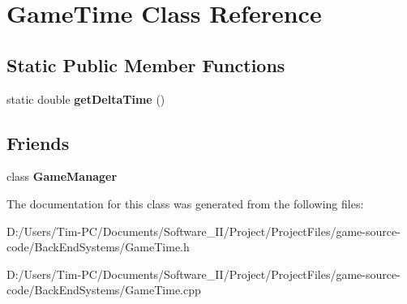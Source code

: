 \hypertarget{class_game_time}{}\section{Game\+Time Class Reference}
\label{class_game_time}
\subsection*{Static Public Member Functions}
\begin{DoxyCompactItemize}
\item 
\mbox{\label{class_game_time_aa5ea84c887116ef68d1331617c5a81c3}} 
static double {\bfseries get\+Delta\+Time} ()
\end{DoxyCompactItemize}
\subsection*{Friends}
\begin{DoxyCompactItemize}
\item 
\mbox{\label{class_game_time_a140a2a29511147897abbb772733f6c2c}} 
class {\bfseries Game\+Manager}
\end{DoxyCompactItemize}


The documentation for this class was generated from the following files\+:\begin{DoxyCompactItemize}
\item 
D\+:/\+Users/\+Tim-\/\+P\+C/\+Documents/\+Software\+\_\+\+I\+I/\+Project/\+Project\+Files/game-\/source-\/code/\+Back\+End\+Systems/Game\+Time.\+h\item 
D\+:/\+Users/\+Tim-\/\+P\+C/\+Documents/\+Software\+\_\+\+I\+I/\+Project/\+Project\+Files/game-\/source-\/code/\+Back\+End\+Systems/Game\+Time.\+cpp\end{DoxyCompactItemize}
